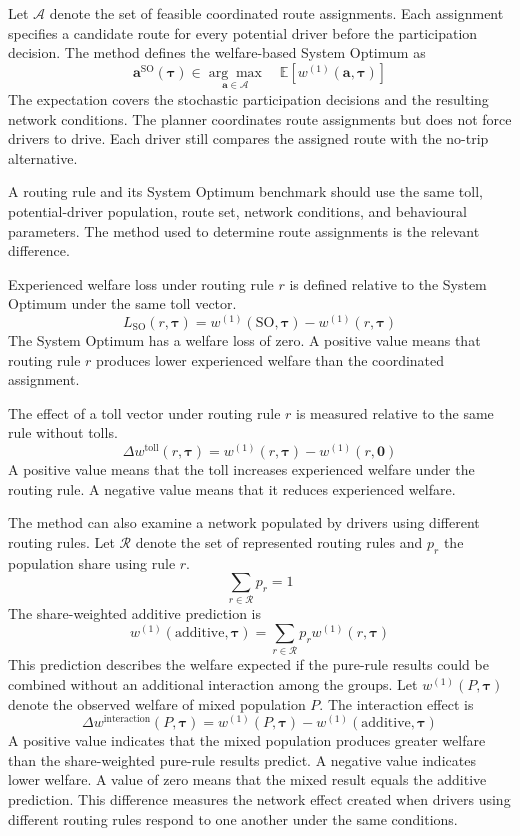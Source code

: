 \documentclass{article}
\begin{document}
Let $\mathcal A$ denote the set of feasible coordinated route assignments. Each assignment specifies a candidate route for every potential driver before the participation decision. The method defines the welfare-based System Optimum as
\[
\boldsymbol a^{\mathrm{SO}}(\boldsymbol{\tau})
\in
\underset{\boldsymbol a\in\mathcal A}{\arg\max}
\quad
\mathbb E
\left[
w^{(1)}(\boldsymbol a,\boldsymbol{\tau})
\right]
\]
The expectation covers the stochastic participation decisions and the resulting network conditions. The planner coordinates route assignments but does not force drivers to drive. Each driver still compares the assigned route with the no-trip alternative.

A routing rule and its System Optimum benchmark should use the same toll, potential-driver population, route set, network conditions, and behavioural parameters. The method used to determine route assignments is the relevant difference.

Experienced welfare loss under routing rule $r$ is defined relative to the System Optimum under the same toll vector.
\[
L_{\mathrm{SO}}(r,\boldsymbol{\tau})
=
w^{(1)}(\mathrm{SO},\boldsymbol{\tau})
-
w^{(1)}(r,\boldsymbol{\tau})
\]
The System Optimum has a welfare loss of zero. A positive value means that routing rule $r$ produces lower experienced welfare than the coordinated assignment.

The effect of a toll vector under routing rule $r$ is measured relative to the same rule without tolls.
\[
\Delta w^{\mathrm{toll}}(r,\boldsymbol{\tau})
=
w^{(1)}(r,\boldsymbol{\tau})
-
w^{(1)}(r,\boldsymbol{0})
\]
A positive value means that the toll increases experienced welfare under the routing rule. A negative value means that it reduces experienced welfare.

The method can also examine a network populated by drivers using different routing rules. Let $\mathcal R$ denote the set of represented routing rules and $p_r$ the population share using rule $r$.
\[
\sum_{r\in\mathcal R}p_r=1
\]
The share-weighted additive prediction is
\[
w^{(1)}(\mathrm{additive},\boldsymbol{\tau})
=
\sum_{r\in\mathcal R}
p_r w^{(1)}(r,\boldsymbol{\tau})
\]
This prediction describes the welfare expected if the pure-rule results could be combined without an additional interaction among the groups. Let $w^{(1)}(P,\boldsymbol{\tau})$ denote the observed welfare of mixed population $P$. The interaction effect is
\[
\Delta w^{\mathrm{interaction}}(P,\boldsymbol{\tau})
=
w^{(1)}(P,\boldsymbol{\tau})
-
w^{(1)}(\mathrm{additive},\boldsymbol{\tau})
\]
A positive value indicates that the mixed population produces greater welfare than the share-weighted pure-rule results predict. A negative value indicates lower welfare. A value of zero means that the mixed result equals the additive prediction. This difference measures the network effect created when drivers using different routing rules respond to one another under the same conditions.
\end{document}
